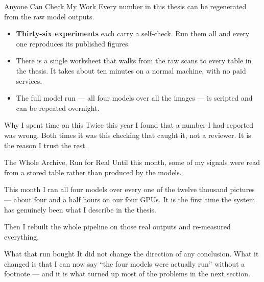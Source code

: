 \documentclass[aspectratio=169,11pt]{beamer}
\begin{document}
\begin{frame}{Anyone Can Check My Work}
\normalsize
Every number in this thesis can be regenerated from the raw model outputs.
\vspace{4mm}

\small
\begin{itemize}
  \setlength\itemsep{2mm}
  \item \textbf{Thirty-six experiments} each carry a self-check. Run them all and every one reproduces its published figures.
  \item There is a single worksheet that walks from the raw scans to every table in the thesis. It takes about ten minutes on a normal machine, with no paid services.
  \item The full model run --- all four models over all the images --- is scripted and can be repeated overnight.
\end{itemize}
\vspace{4mm}

\begin{block}{\small Why I spent time on this}
Twice this year I found that a number I had reported was wrong. Both times it was this checking that caught it, not a reviewer. It is the reason I trust the rest.
\end{block}
\end{frame}

\begin{frame}{The Whole Archive, Run for Real}
\normalsize
Until this month, some of my signals were read from a stored table rather than produced by the models.
\vspace{4mm}

\small
This month I ran all four models over every one of the twelve thousand pictures --- about four and a half hours on our four GPUs. It is the first time the system has genuinely been what I describe in the thesis.
\vspace{4mm}

Then I rebuilt the whole pipeline on those real outputs and re-measured everything.
\vspace{4mm}

\begin{block}{\small What that run bought}
\small It did not change the direction of any conclusion. What it changed is that I can now say ``the four models were actually run'' without a footnote --- and it is what turned up most of the problems in the next section.
\end{block}
\end{frame}
\end{document}

